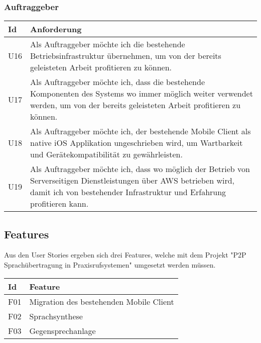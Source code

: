 \subsubsection*{Auftraggeber}

\begin{table}[h]
    \centering
    \begin{tabular}{|l|p{15cm}|}
        \hline
        \textbf{Id} & \textbf{Anforderung}                                                                                                                                                             \\
        \hline
        U16           & Als Auftraggeber möchte ich die bestehende Betriebsinfrastruktur übernehmen, um von der bereits geleisteten Arbeit profitieren zu können.                                        \\
        \hline
        U17           & Als Auftraggeber möchte ich, dass die bestehende Komponenten des Systems wo immer möglich weiter verwendet werden, um von der bereits geleisteten Arbeit profitieren zu können. \\
        \hline
        U18           & Als Auftraggeber möchte ich, der bestehende Mobile Client als native iOS Applikation ungeschrieben wird, um Wartbarkeit und Gerätekompatibilität zu gewährleisten. \\
        \hline
        U19           & Als Auftraggeber möchte ich, dass wo möglich der Betrieb von Serverseitigen Dienstleistungen über AWS betrieben wird, damit ich von bestehender Infrastruktur und Erfahrung profitieren kann. \\
        \hline
    \end{tabular}\label{tab:userstories3}
\end{table}

\subsection*{Features}

Aus den User Stories ergeben sich drei Features, welche mit dem Projekt "P2P Sprachübertragung in Praxisrufsystemen" umgesetzt werden müssen.

\begin{table}[h]
    \centering
    \begin{tabular}{|l|p{15cm}|}
        \hline
        \textbf{Id} & \textbf{Feature}                                                                                                                                                             \\
        \hline
        F01           & Migration des bestehenden Mobile Client                                        \\
        \hline
        F02           & Sprachsynthese \\
        \hline
        F03           & Gegensprechanlage \\
        \hline
    \end{tabular}\label{tab:features}
\end{table}

